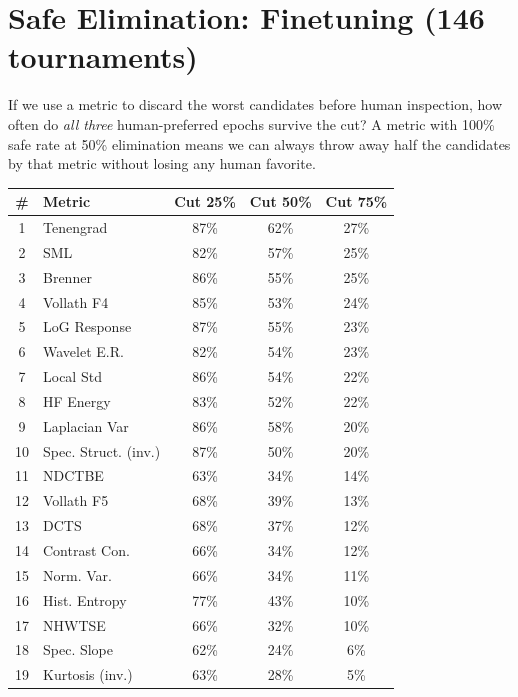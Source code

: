 \documentclass[11pt]{article}
\begin{document}
\section{Safe Elimination: Finetuning (146 tournaments)}

If we use a metric to discard the worst candidates before human inspection, 
how often do \emph{all three} human-preferred epochs survive the cut? 
A metric with 100\% safe rate at 50\% elimination means we can always 
throw away half the candidates by that metric without losing any human favorite.

\vspace{0.5em}
\begin{center}
\small
\begin{tabular}{clccc}
\toprule
\textbf{\#} & \textbf{Metric} & \textbf{Cut 25\%} & \textbf{Cut 50\%} & \textbf{Cut 75\%} \\
\midrule
1 & Tenengrad & 87\% & 62\% & 27\% \\
2 & SML & 82\% & 57\% & 25\% \\
3 & Brenner & 86\% & 55\% & 25\% \\
4 & Vollath F4 & 85\% & 53\% & 24\% \\
5 & LoG Response & 87\% & 55\% & 23\% \\
6 & Wavelet E.R. & 82\% & 54\% & 23\% \\
7 & Local Std & 86\% & 54\% & 22\% \\
8 & HF Energy & 83\% & 52\% & 22\% \\
9 & Laplacian Var & 86\% & 58\% & 20\% \\
10 & Spec. Struct. (inv.) & 87\% & 50\% & 20\% \\
\rowcolor{botrow} 11 & NDCTBE & 63\% & 34\% & 14\% \\
\rowcolor{botrow} 12 & Vollath F5 & 68\% & 39\% & 13\% \\
\rowcolor{botrow} 13 & DCTS & 68\% & 37\% & 12\% \\
\rowcolor{botrow} 14 & Contrast Con. & 66\% & 34\% & 12\% \\
\rowcolor{botrow} 15 & Norm. Var. & 66\% & 34\% & 11\% \\
\rowcolor{botrow} 16 & Hist. Entropy & 77\% & 43\% & 10\% \\
\rowcolor{botrow} 17 & NHWTSE & 66\% & 32\% & 10\% \\
\rowcolor{botrow} 18 & Spec. Slope & 62\% & 24\% & 6\% \\
\rowcolor{botrow} 19 & Kurtosis (inv.) & 63\% & 28\% & 5\% \\
\bottomrule
\end{tabular}
\end{center}
\end{document}
